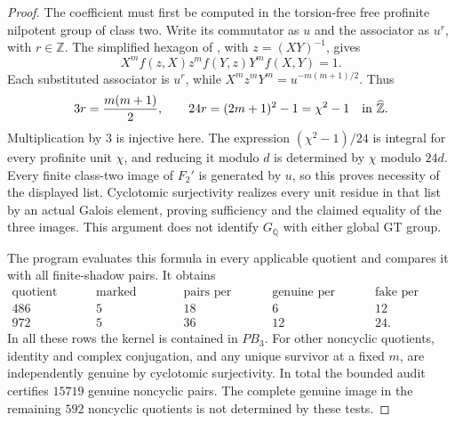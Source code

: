 \begin{proof}
The coefficient must first be computed in the torsion-free
free profinite nilpotent group of class two. Write its commutator
as $u$ and the associator as $u^r$, with $r\in\widehat{\mathbb Z}$.
The simplified hexagon of
\citet[Proposition~3.4]{DolgushevGuynee2024}, with
$z=(XY)^{-1}$, gives
\[
 X^m f(z,X)z^m f(Y,z)Y^m f(X,Y)=1.
\]
Each substituted associator is $u^r$, while
$X^m z^mY^m=u^{-m(m+1)/2}$. Thus
\[
 3r=\frac{m(m+1)}2,
 \qquad 24r=(2m+1)^2-1=\chi^2-1
 \quad\hbox{in }\widehat{\mathbb Z}.
\]
Multiplication by $3$ is injective here. The expression
$(\chi^2-1)/24$ is integral for every profinite unit $\chi$,
and reducing it modulo $d$ is determined by $\chi$ modulo
$24d$. Every finite class-two image of $F_2'$ is generated by
$u$, so this proves necessity of the displayed list.
Cyclotomic surjectivity realizes every unit residue in that
list by an actual Galois element, proving sufficiency and the
claimed equality of the three images. This argument does not
identify $G_{\mathbb Q}$ with either global GT group.

The program evaluates this formula in every applicable quotient
and compares it with all finite-shadow pairs. It obtains
\[
\begin{array}{r|r|r|r|r}
\text{quotient order}&\text{marked kernels}&
 \text{pairs per kernel}&\text{genuine per kernel}&
 \text{fake per kernel}\\\hline
486&5&18&6&12\\972&5&36&12&24.
\end{array}
\]
In all these rows the kernel is contained in $PB_3$.
For other noncyclic quotients, identity and complex conjugation,
and any unique survivor at a fixed $m$, are independently genuine
by cyclotomic surjectivity. In total the bounded audit certifies
$15719$ genuine noncyclic pairs. The complete genuine image in
the remaining $592$ noncyclic quotients is not determined by
these tests.


\end{proof}
